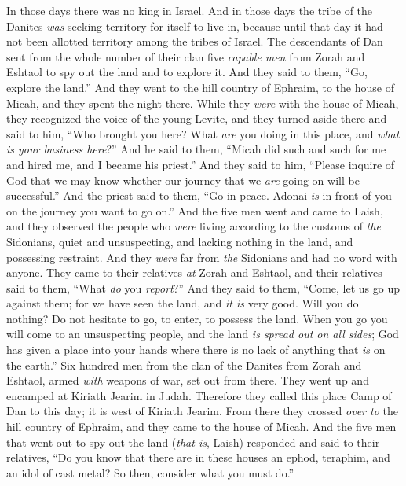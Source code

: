 \begin{biblechapter} %
 In those days there was no king in Israel. And in those days the tribe of the Danites \textit{was} seeking territory for itself to live in, because until that day it had not been allotted territory among the tribes of Israel.
\verse The descendants of Dan sent from the whole number of their clan five \textit{capable men} from Zorah and Eshtaol to spy out the land and to explore it. And they said to them, “Go, explore the land.” And they went to the hill country of Ephraim, to the house of Micah, and they spent the night there.
\verse While they \textit{were} with the house of Micah, they recognized the voice of the young Levite, and they turned aside there and said to him, “Who brought you here? What \textit{are} you doing in this place, and \textit{what is your business here}?”
\verse And he said to them, “Micah did such and such for me and hired me, and I became his priest.”
\verse And they said to him, “Please inquire of God that we may know whether our journey that we \textit{are} going on will be successful.”
\verse And the priest said to them, “Go in peace. Adonai \textit{is} in front of you on the journey you want to go on.”
\verse And the five men went and came to Laish, and they observed the people who \textit{were} living according to the customs of \textit{the} Sidonians, quiet and unsuspecting, and lacking nothing in the land, and possessing restraint. And they \textit{were} far from \textit{the} Sidonians and had no word with anyone.
\verse They came to their relatives \textit{at} Zorah and Eshtaol, and their relatives said to them, “What \textit{do} you \textit{report}?”
\verse And they said to them, “Come, let us go up against them; for we have seen the land, and \textit{it is} very good. Will you do nothing? Do not hesitate to go, to enter, to possess the land.
\verse When you go you will come to an unsuspecting people, and the land \textit{is spread out on all sides}; God has given a place into your hands where there is no lack of anything that \textit{is} on the earth.”
\verse Six hundred men from the clan of the Danites from Zorah and Eshtaol, armed \textit{with} weapons of war, set out from there.
\verse They went up and encamped at Kiriath Jearim in Judah. Therefore they called this place Camp of Dan to this day; it is west of Kiriath Jearim.
\verse From there they crossed \textit{over to} the hill country of Ephraim, and they came to the house of Micah.
\verse And the five men that went out to spy out the land (\textit{that is}, Laish) responded and said to their relatives, “Do you know that there are in these houses an ephod, teraphim, and an idol of cast metal? So then, consider what you must do.”

\end{biblechapter}
